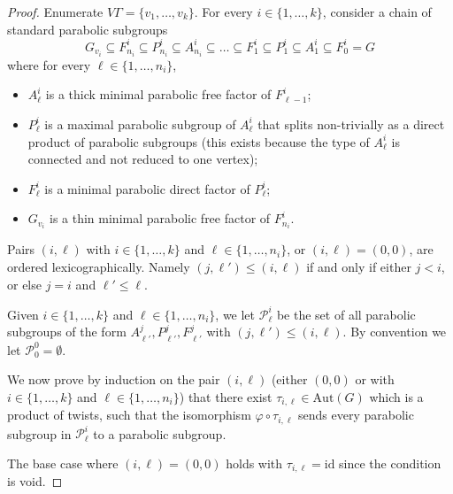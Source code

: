 \documentclass[a4paper,english,11pt]{article}
\theoremstyle{definition}
\theoremstyle{remark}
\newcommand{\Aut}{\mathrm{Aut}}
\begin{document}
\begin{proof}
Enumerate $V\Gamma=\{v_1,\dots,v_k\}$. For every $i\in\{1,\dots,k\}$, consider a chain of standard parabolic subgroups \[G_{v_i}\subseteq F_{n_i}^i\subseteq P_{n_i}^i\subseteq A_{n_i}^i\subseteq\dots\subseteq F_1^i\subseteq P_1^i\subseteq A_1^i\subseteq F^{i}_0=G\] where for every $\ell\in\{1,\dots,n_i\}$,
    \begin{itemize}
        \item $A_\ell^i$ is a thick minimal parabolic free factor of $F_{\ell-1}^i$;
        \item $P_\ell^i$ is a maximal parabolic subgroup of $A_\ell^i$ that splits non-trivially as a direct product of parabolic subgroups (this exists because the type of $A_\ell^i$ is connected and not reduced to one vertex);
        \item $F_\ell^i$ is a minimal parabolic direct factor of $P_\ell^i$;
        \item $G_{v_i}$ is a thin minimal parabolic free factor of $F_{n_i}^i$.
        \end{itemize}
Pairs $(i,\ell)$ with $i\in\{1,\dots,k\}$ and $\ell\in\{1,\dots,n_i\}$, or $(i,\ell)=(0,0)$, are ordered lexicographically. Namely $(j,\ell')\le (i,\ell)$ if and only if either $j<i$, or else $j=i$ and $\ell'\le\ell$.

Given $i\in\{1,\dots,k\}$ and $\ell\in\{1,\dots,n_i\}$, we let $\mathcal{P}_\ell^i$ be the set of all parabolic subgroups of the form $A_{\ell'}^j,P_{\ell'}^j,F_{\ell'}^j$ with $(j,\ell')\le (i,\ell)$. By convention we let $\mathcal{P}^0_0=\emptyset$.

We now prove by induction on the pair $(i,\ell)$ (either $(0,0)$ or with $i\in\{1,\dots,k\}$ and $\ell\in\{1,\dots,n_i\}$) that there exist $\tau_{i,\ell}\in\Aut(G)$ which is a product of twists, such that the isomorphism $\varphi\circ\tau_{i,\ell}$ sends every parabolic subgroup in $\mathcal{P}_\ell^i$ to a parabolic subgroup.

The base case where $(i,\ell)=(0,0)$ holds with $\tau_{i,\ell}=\mathrm{id}$ since the condition is void.


\end{proof}
\end{document}
